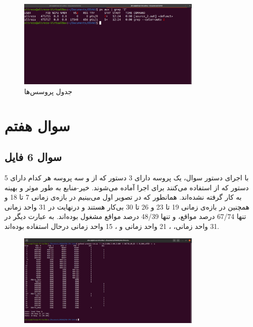 \documentclass{article}
\begin{document}
\begin{figure}[H]
    \centering
    \includegraphics[width=0.8\textwidth]{figures/6.2.2.2.png}
    \caption{جدول پروسس‌ها}
    \label{fig:fig1}
\end{figure}

\section{سوال هفتم}
\subsection{سوال 6 فایل}
با اجرای دستور سوال، یک پروسه دارای 3 دستور که از  و سه پروسه هر کدام دارای 5 دستور که از  استفاده می‌کنند برای اجرا آماده می‌شوند.
\newline
خیر-منابع به طور موثر و بهینه به کار گرفته نشده‌اند. همانطور که در تصویر اول می‌بینیم  در بازه‌ی زمانی 7 تا 18 و همچنین  در بازه‌ی زمانی 19 تا 23 و 26 تا 30 بی‌کار هستند و درنهایت در 31 واحد زمانی  تنها 67/74 درصد مواقع، و  تنها 48/39 درصد مواقع مشغول بوده‌اند. به عبارت دیگر در 31 واحد زمانی، ، 21 واحد زمانی و ، 15 واحد زمانی درحال استفاده بوده‌اند.
\begin{figure}[H]
    \centering
    \includegraphics[width=0.8\textwidth]{figures/7.1.png}
    \caption{}
    \label{fig:fig1}
\end{figure}
\end{document}
